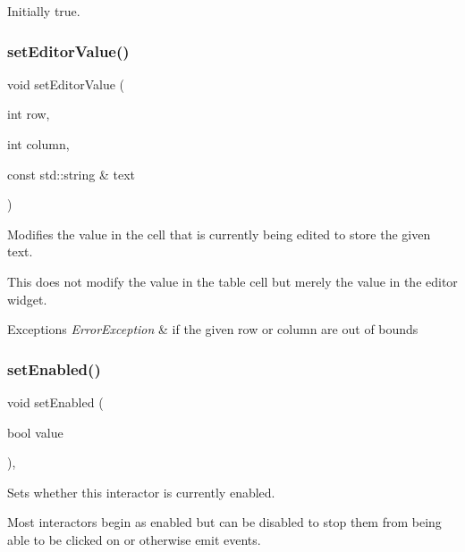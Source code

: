 Initially true. \mbox{\label{classsgl_1_1GTable_aaefc85e4ff762ca176a90ebac163f2c0}} 
\subsubsection{\texorpdfstring{set\+Editor\+Value()}{setEditorValue()}}
{\footnotesize\ttfamily void set\+Editor\+Value (\begin{DoxyParamCaption}\item[{int}]{row,  }\item[{int}]{column,  }\item[{const std\+::string \&}]{text }\end{DoxyParamCaption})\hspace{0.3cm}{\ttfamily [virtual]}}



Modifies the value in the cell that is currently being edited to store the given text. 

This does not modify the value in the table cell but merely the value in the editor widget. 
\begin{DoxyExceptions}{Exceptions}
{\em Error\+Exception} & if the given row or column are out of bounds \\
\hline
\end{DoxyExceptions}
\mbox{\label{classsgl_1_1GInteractor_ab831367dd84bbd579e02e55bacb21343}} 
\subsubsection{\texorpdfstring{set\+Enabled()}{setEnabled()}}
{\footnotesize\ttfamily void set\+Enabled (\begin{DoxyParamCaption}\item[{bool}]{value }\end{DoxyParamCaption})\hspace{0.3cm}{\ttfamily [virtual]}, {\ttfamily [inherited]}}



Sets whether this interactor is currently enabled. 

Most interactors begin as enabled but can be disabled to stop them from being able to be clicked on or otherwise emit events. \mbox{\label{classsgl_1_1GObservable_ad2f6d34961c50f6c1e0659990b79f741}} 

